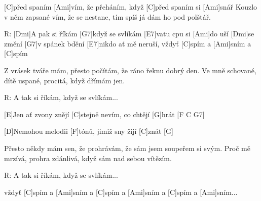 
[C] před spaním [Ami]vím, že přeháním,
když [C] před spaním si [Ami]snář
Kouzlo v něm zapsané vím, že se nestane,
tím spíš já dám ho pod polštář.

R: [Dmi]A pak si říkám [G7]když se svlíkám [E7]vatu cpu si [Ami]do uší
[Dmi] se změní [G7]v spánek bdění [E7]nikdo ať mě neruší,
vždyť [C]spím a [Ami]sním a [C]spím

Z vrásek tváře mám, přesto počítám,
že ráno řeknu dobrý den.
Ve mně schované, dítě uspané,
procitá, když dřímám jen.

R: A tak si říkám, když se svlíkám...

[E]Jen ať zvony znějí [C]stejně nevím, co chtějí [G]hrát [F C G7]

[D]Nemohou melodii [F]tónů, jimiž sny žijí [C]znát [G]

Přesto někdy mám sen, že prohrávám,
že sám jsem soupeřem si svým.
Proč mě mrzívá, prohra zdánlivá,
když sám nad sebou vítězím.

R: A tak si říkám, když se svlíkám...

vždyť [C]spím a [Ami]sním a [C]spím a [Ami]sním a [C]spím a [Ami]sním...



